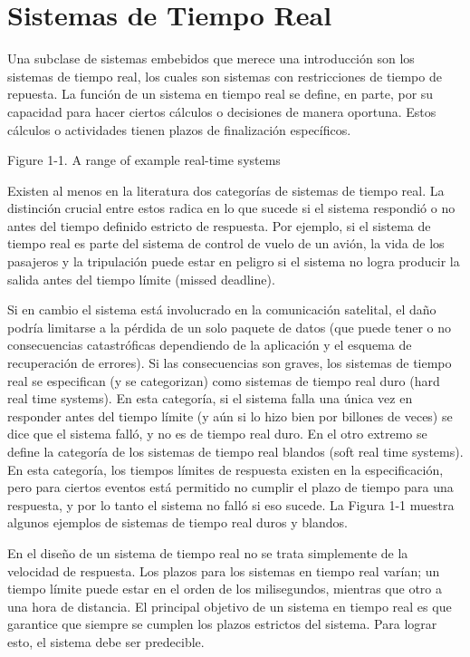 \documentclass[output=paper, 
colorlinks,
citecolor=brown,
newtxmath
]{langscibook}
\begin{document}
\section {Sistemas de Tiempo Real} 



Una subclase de sistemas embebidos que merece una introducción son los sistemas de tiempo real,
los cuales son sistemas con restricciones de tiempo de repuesta.
La función de un sistema en tiempo real se define, en parte, por su capacidad para hacer
ciertos cálculos o decisiones de manera oportuna. Estos cálculos o actividades 
tienen plazos de finalización específicos.


Figure 1-1. A range of example real-time systems

Existen al menos en la literatura dos categorías de sistemas de tiempo real.
La distinción crucial entre estos radica en lo que sucede si el sistema respondió o no antes
del tiempo definido estricto de respuesta.
Por ejemplo, si el sistema de tiempo real es parte del sistema de control de vuelo de un avión, 
la vida de los pasajeros y la tripulación puede estar en peligro si el sistema no logra
producir la salida antes del tiempo límite (missed deadline).

Si en cambio el sistema está involucrado en la comunicación satelital, el daño podría 
limitarse a la pérdida de un solo paquete de datos (que puede tener o no consecuencias 
catastróficas dependiendo de la aplicación y el esquema de recuperación de errores). 
Si las consecuencias son graves, los sistemas de tiempo real se especifican (y se categorizan)
como sistemas de tiempo real duro (hard real time systems). En esta categoría, si el sistema falla una única vez
en responder antes del tiempo límite (y aún si lo hizo bien por billones de veces) se dice que el 
sistema falló, y no es de tiempo real duro.
En el otro extremo se define la categoría de los sistemas de tiempo real blandos (soft real time systems).
En esta categoría, los tiempos límites de respuesta existen en la especificación, pero para
ciertos eventos está permitido no cumplir el plazo de tiempo para una respuesta, y por lo tanto
el sistema no falló si eso sucede.
La Figura 1-1 muestra algunos ejemplos de sistemas de tiempo real duros y blandos.







En el diseño de un sistema de tiempo real no se trata simplemente de la
velocidad de respuesta. Los plazos para los sistemas en tiempo real varían; 
un tiempo límite puede estar en el orden de los milisegundos, mientras que otro 
a una hora de distancia. El principal objetivo de un sistema en tiempo real es
que garantice que siempre se cumplen los plazos estrictos del sistema. 
Para lograr esto, el sistema debe ser predecible.
\end{document}
